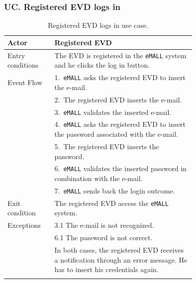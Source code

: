 \subsubsection*{UC\cuc . Registered EVD logs in}
\begin{center}
    \begin{longtable}{lp{0.75\linewidth}}
        \hline
        Actor            & Registered EVD                                                                       \\
        \hline
        Entry conditions & The EVD is registered in the \verb|eMALL| system and he clicks the log in button.           \\
        \hline
        Event Flow       & 1.\ \verb|eMALL| asks the registered EVD to insert the e-mail.                              \\
        & 2.\ The registered EVD inserts the e-mail.                                           \\
        & 3.\ \verb|eMALL| validates the inserted e-mail.                                             \\
        & 4.\ \verb|eMALL| asks the registered EVD to insert the password associated with the e-mail. \\
        & 5.\ The registered EVD inserts the password.                                         \\
        & 6.\ \verb|eMALL| validates the inserted password in combination with the e-mail.            \\
        & 7.\ \verb|eMALL| sends back the login outcome.                                              \\
        \hline
        Exit condition   & The registered EVD access the \verb|eMALL| system.                                          \\
        \hline
        Exceptions       & 3.1 The e-mail is not recognized.                                                    \\
        & 6.1 The password is not correct.                                                     \\
        & In both cases, the registered EVD receives a notification through an error message.
        He has to insert his credentials again. \\
        \hline
        \caption{Registered EVD logs in use case.}
        \label{tab: EVD_logs_in_use_case}
    \end{longtable}



\end{center}
